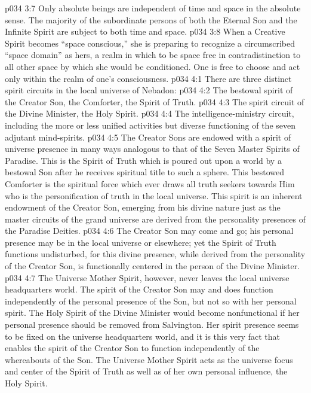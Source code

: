 \pc \vs p034 3:7 Only absolute beings are independent of time and space in the absolute sense. The majority of the subordinate persons of both the Eternal Son and the Infinite Spirit are subject to both time and space.
\vs p034 3:8 When a Creative Spirit becomes “space conscious,” she is preparing to recognize a circumscribed “space domain” as hers, a realm in which to be space free in contradistinction to all other space by which she would be conditioned. One is free to choose and act only within the realm of one’s consciousness.
\vs p034 4:1 There are three distinct spirit circuits in the local universe of Nebadon:
\pc \vs p034 4:2 \bibnobreakspace The bestowal spirit of the Creator Son, the Comforter, the Spirit of Truth.
\vs p034 4:3 \bibnobreakspace The spirit circuit of the Divine Minister, the Holy Spirit.
\vs p034 4:4 \bibnobreakspace The intelligence\hyp{}ministry circuit, including the more or less unified activities but diverse functioning of the seven adjutant mind\hyp{}spirits.
\pc \vs p034 4:5 The Creator Sons are endowed with a spirit of universe presence in many ways analogous to that of the Seven Master Spirits of Paradise. This is the Spirit of Truth which is poured out upon a world by a bestowal Son after he receives spiritual title to such a sphere. This bestowed Comforter is the spiritual force which ever draws all truth seekers towards Him who is the personification of truth in the local universe. This spirit is an inherent endowment of the Creator Son, emerging from his divine nature just as the master circuits of the grand universe are derived from the personality presences of the Paradise Deities.\plusone
\vs p034 4:6 The Creator Son may come and go; his personal presence may be in the local universe or elsewhere; yet the Spirit of Truth functions undisturbed, for this divine presence, while derived from the personality of the Creator Son, is functionally centered in the person of the Divine Minister.
\vs p034 4:7 The Universe Mother Spirit, however, never leaves the local universe headquarters world. The spirit of the Creator Son may and does function independently of the personal presence of the Son, but not so with her personal spirit. The Holy Spirit of the Divine Minister would become nonfunctional if her personal presence should be removed from Salvington. Her spirit presence seems to be fixed on the universe headquarters world, and it is this very fact that enables the spirit of the Creator Son to function independently of the whereabouts of the Son. The Universe Mother Spirit acts as the universe focus and center of the Spirit of Truth as well as of her own personal influence, the Holy Spirit.
